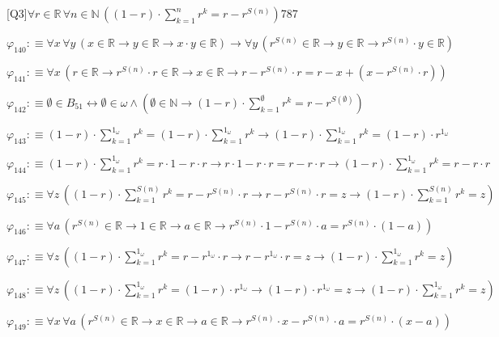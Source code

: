 \begin{fullproof}{[Q3]}{$\forall r \in \mathbb{R}\,\forall n \in \mathbb{N}\,((1 - r) \cdot {\textstyle\sum_{k=1}^{n} {{r}^{k}}} = r - {{r}^{S(n)}})$}{787}
\begin{abbrevlist}
\item $\varphi_{140} :\equiv \forall x\,\forall y\,(x \in \mathbb{R} \to y \in \mathbb{R} \to x \cdot y \in \mathbb{R}) \to \forall y\,({{r}^{S(n)}} \in \mathbb{R} \to y \in \mathbb{R} \to {{r}^{S(n)}} \cdot y \in \mathbb{R})$
\item $\varphi_{141} :\equiv \forall x\,(r \in \mathbb{R} \to {{r}^{S(n)}} \cdot r \in \mathbb{R} \to x \in \mathbb{R} \to r - {{r}^{S(n)}} \cdot r = r - x + (x - {{r}^{S(n)}} \cdot r))$
\item $\varphi_{142} :\equiv \emptyset \in B_{51} \leftrightarrow \emptyset \in \omega \land (\emptyset \in \mathbb{N} \to (1 - r) \cdot {\textstyle\sum_{k=1}^{\emptyset} {{r}^{k}}} = r - {{r}^{S(\emptyset)}})$
\item $\varphi_{143} :\equiv (1 - r) \cdot {\textstyle\sum_{k=1}^{1_{\omega}} {{r}^{k}}} = (1 - r) \cdot {\textstyle\sum_{k=1}^{1_{\omega}} {{r}^{k}}} \to (1 - r) \cdot {\textstyle\sum_{k=1}^{1_{\omega}} {{r}^{k}}} = (1 - r) \cdot {{r}^{1_{\omega}}}$
\item $\varphi_{144} :\equiv (1 - r) \cdot {\textstyle\sum_{k=1}^{1_{\omega}} {{r}^{k}}} = r \cdot 1 - r \cdot r \to r \cdot 1 - r \cdot r = r - r \cdot r \to (1 - r) \cdot {\textstyle\sum_{k=1}^{1_{\omega}} {{r}^{k}}} = r - r \cdot r$
\item $\varphi_{145} :\equiv \forall z\,((1 - r) \cdot {\textstyle\sum_{k=1}^{S(n)} {{r}^{k}}} = r - {{r}^{S(n)}} \cdot r \to r - {{r}^{S(n)}} \cdot r = z \to (1 - r) \cdot {\textstyle\sum_{k=1}^{S(n)} {{r}^{k}}} = z)$
\item $\varphi_{146} :\equiv \forall a\,({{r}^{S(n)}} \in \mathbb{R} \to 1 \in \mathbb{R} \to a \in \mathbb{R} \to {{r}^{S(n)}} \cdot 1 - {{r}^{S(n)}} \cdot a = {{r}^{S(n)}} \cdot (1 - a))$
\item $\varphi_{147} :\equiv \forall z\,((1 - r) \cdot {\textstyle\sum_{k=1}^{1_{\omega}} {{r}^{k}}} = r - {{r}^{1_{\omega}}} \cdot r \to r - {{r}^{1_{\omega}}} \cdot r = z \to (1 - r) \cdot {\textstyle\sum_{k=1}^{1_{\omega}} {{r}^{k}}} = z)$
\item $\varphi_{148} :\equiv \forall z\,((1 - r) \cdot {\textstyle\sum_{k=1}^{1_{\omega}} {{r}^{k}}} = (1 - r) \cdot {{r}^{1_{\omega}}} \to (1 - r) \cdot {{r}^{1_{\omega}}} = z \to (1 - r) \cdot {\textstyle\sum_{k=1}^{1_{\omega}} {{r}^{k}}} = z)$
\item $\varphi_{149} :\equiv \forall x\,\forall a\,({{r}^{S(n)}} \in \mathbb{R} \to x \in \mathbb{R} \to a \in \mathbb{R} \to {{r}^{S(n)}} \cdot x - {{r}^{S(n)}} \cdot a = {{r}^{S(n)}} \cdot (x - a))$

\end{abbrevlist}
\end{fullproof}
